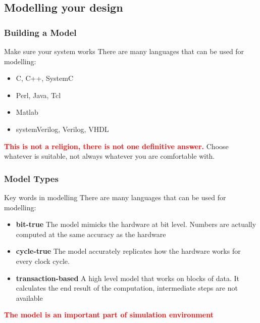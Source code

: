 \documentclass[compress]{beamer}
\begin{document}
\subsection[Modelling]{Modelling your design}
\begin{frame}
	\frametitle{Building a Model}
	\begin{block}{Make sure your system works}
		There are many languages that can be used for modelling:
		\begin{itemize}
			\item C, C++, SystemC
			\item Perl, Java, Tcl
			\item Matlab
			\item systemVerilog, Verilog, VHDL
		\end{itemize}
		\textcolor{red}{\textbf{This is not a religion, there is not one definitive answer.}} \newline
		Choose whatever is suitable, not always whatever you are
		comfortable with.
	\end{block}
\end{frame}

\begin{frame}
	\frametitle{Model Types}
	\begin{block}{Key words in modelling}
	There are many languages that can be used for modelling:
	\begin{itemize}
		\item \textbf {bit-true} \newline
		The model mimicks the hardware at bit level. Numbers are
		actually computed at the same accuracy as the hardware
		\item \textbf {cycle-true} \newline
		The model accurately replicates how the hardware works for
		every clock cycle.
		\item \textbf {transaction-based} \newline
		A high level model that works on blocks of data. It calculates
		the end result of the computation, intermediate steps are not
		available
	\end{itemize}
	\textcolor{red}{\textbf{The model is an important part of simulation environment}}
\end{block}
\end{frame}
\end{document}
